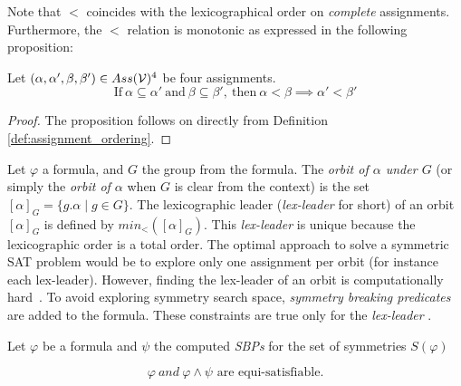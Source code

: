 Note that $<$ coincides with the lexicographical order on \emph{complete}
assignments. Furthermore, the $<$ relation is monotonic as expressed in the following proposition:

\begin{proposition}
	\label{prop:monocity_assignments_ordering}
	Let  $(\alpha,\alpha',\beta,\beta') \in Ass(\mathcal{V})^4 $ be four assignments.
	$$\text{If}~\alpha \subseteq \alpha'~\text{and}~\beta \subseteq \beta',~\text{then}~\alpha < \beta \implies \alpha' < \beta'$$
\end{proposition}

\begin{proof}
	The proposition follows on directly from Definition \ref{def:assignment_ordering}.
\end{proof}


Let $\varphi$ a formula, and $G$ the group from the formula.
The \emph{orbit of $\alpha$ under $G$} (or
simply the \emph{orbit of $\alpha$} when $G$ is clear from the context) is the set
$ [\alpha]_G=\{ g.\alpha \mid g \in G \}$. The lexicographic leader
(\textit{lex-leader} for short) of an orbit $[\alpha]_G$ is defined by
$min_<([\alpha]_G)$. This \textit{lex-leader} is unique because the lexicographic
order is a total order.
The optimal approach to solve a symmetric SAT problem would be to explore
only one assignment per orbit (for instance each lex-leader). However, finding the
lex-leader of an orbit is computationally hard~\cite{Luks2004}. To avoid exploring 
symmetry search space, \emph{symmetry breaking predicates} are added to the formula.
These constraints are true only for the \emph{lex-leader} \cite{crawford1996symmetry}.






\begin{theorem}
	\label{theorem:satisfiability_preservation_SBPs}
	Let $\varphi$ be a formula and $\psi$ the computed \textit{SBPs} for the set of
	symmetries $S(\varphi)$
	
	$$\varphi~and ~\varphi \wedge \psi \text{ are equi-satisfiable}.$$
\end{theorem}

